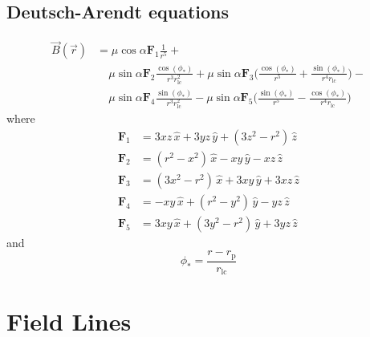 \documentclass{book}
\newcommand{\F}[1]{\bm{F}_{#1}}
\newcommand{\ph}{\phi_\ast}
\newcommand{\rL}{r_\text{lc}} %
\newcommand{\rp}{r_\text{p}} %
\begin{document}
\subsection{Deutsch-Arendt equations}

\begin{equation}
\begin{aligned}
    \vec{B}(\vec{r}) &= \mu \cos{\alpha} \F{1} \frac{1}{r^5} + \\
                   &\hspace{13pt} \mu \sin{\alpha} \F{2} \frac{\cos(\ph)}{r^3 \rL^2} +
                                  \mu \sin{\alpha} \F{3} \bigg(\frac{\cos(\ph)}{r^5} + \frac{\sin(\ph)}{r^4 \rL}\bigg) - \\
                   &\hspace{13pt} \mu \sin{\alpha} \F{4} \frac{\sin(\ph)}{r^3 \rL^2} -
                                  \mu \sin{\alpha} \F{5} \bigg(\frac{\sin(\ph)}{r^5} - \frac{\cos(\ph)}{r^4 \rL}\bigg)
\end{aligned}
\end{equation}
where
\begin{equation}
\begin{aligned}
    \F{1} &= 3xz\,\hat{x} + 3yz\,\hat{y} + (3z^2-r^2)\,\hat{z} \\
    \F{2} &= (r^2-x^2)\,\hat{x} - xy\,\hat{y} - xz\,\hat{z} \\
    \F{3} &= (3x^2-r^2)\,\hat{x} + 3xy\,\hat{y} + 3xz\,\hat{z} \\
    \F{4} &= -xy\,\hat{x} + (r^2-y^2)\,\hat{y} - yz\,\hat{z} \\
    \F{5} &= 3xy\,\hat{x} + (3y^2-r^2)\,\hat{y} + 3yz\,\hat{z}
\end{aligned}
\end{equation}
and
\begin{equation}
    \ph = \frac{r - \rp}{\rL}
\end{equation}


\section{Field Lines}
\end{document}
